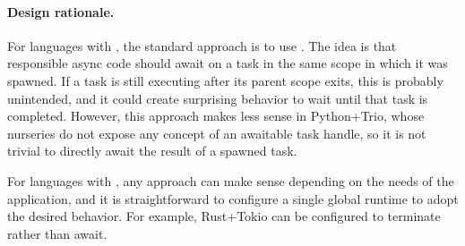 \cprotect{}

\paragraph{Design rationale.} For languages with \dyn \extent, the standard approach is to use \cancelled \destruction. The idea is that responsible async code should await on a task in the same scope in which it was spawned. If a task is still executing after its parent scope exits, this is probably unintended, and it could create surprising behavior to wait until that task is completed. However, this approach makes less sense in Python+Trio, whose nurseries do not expose any concept of an awaitable task handle, so it is not trivial to directly await the result of a spawned task.

For languages with \indef \extent, any approach can make sense depending on the needs of the application, and it is straightforward to configure a single global runtime to adopt the desired behavior. For example, Rust+Tokio can be configured to terminate rather than await.
